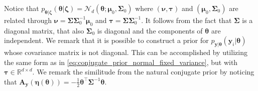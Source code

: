 Notice that $p_{\boldsymbol{\theta}|\boldsymbol{\zeta}}(\boldsymbol{\theta}|\boldsymbol{\zeta}) = \mathcal{N}_d(\boldsymbol{\theta}; \boldsymbol{\mu}_0, \boldsymbol{\Sigma}_0)$ where $(\boldsymbol{\nu},\boldsymbol{\tau})$ and $(\boldsymbol{\mu}_0,  \boldsymbol{\Sigma}_0)$ are related through $\boldsymbol{\nu} = \boldsymbol{\Sigma} \boldsymbol{\Sigma}_0^{-1} \boldsymbol{\mu}_0$ and $\boldsymbol{\tau} = \boldsymbol{\Sigma} \boldsymbol{\Sigma}_0^{-1} $.  It follows from the fact that $\boldsymbol{\Sigma}$ is a diagonal matrix, that also  $\boldsymbol{\Sigma}_{0}$ is diagonal and the components of $\boldsymbol{\theta}$ are independent. We remark that it is possible to construct a prior for $p_{\boldsymbol{y}|\boldsymbol{\theta}}(\boldsymbol{y}_i|\boldsymbol{\theta})$ whose covariance matrix is not diagonal. This can be accomplished by utilizing the same form as in \eqref{eq:conjugate_prior_normal_fixed_variance}, but with $\boldsymbol{\tau}\in\mathbb{R}^{d\times d}$.  We remark the similitude from the natural conjugate prior by noticing that $\mathbf{A}_{\boldsymbol{y}}( \boldsymbol{\eta}(\boldsymbol{\theta}) ) = - \frac{1}{2} \boldsymbol{\theta}^\top \boldsymbol{\Sigma}^{-1} \boldsymbol{\theta}$. 
